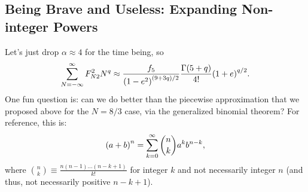 \documentclass[11pt,
        usenames, %
        dvipsnames %
    ]{article}
\DeclarePairedDelimiter\p{\lparen}{\rparen}
\begin{document}
\subsection{Being Brave and Useless: Expanding Non-integer Powers}

Let's just drop $\alpha \approx 4$ for the time being, so
\begin{equation}
    \sum\limits_{N = -\infty}^\infty F_{N2}^2 N^q
        \approx \frac{f_5}{\p*{1 - e^2}^{(9 + 3q) / 2}}
            \frac{\Gamma\p*{5 + q}}{4!} \p*{1 + e}^{q/2}.
\end{equation}
One fun question is: can we do better than the piecewise approximation that we
proposed above for the $N = 8/3$ case, via the generalized binomial theorem? For
reference, this is:
\begin{equation}
    \p*{a + b}^n = \sum\limits_{k = 0}^\infty \binom{n}{k}a^kb^{n - k},
\end{equation}
where $\binom{n}{k} \equiv \frac{n(n - 1)\dots (n - k + 1)}{k!}$ for integer $k$
and not necessarily integer $n$ (and thus, not necessarily positive $n - k +
1$).
\end{document}
